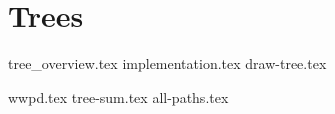 \documentclass{exam}
\begin{document}
\section{Trees}
{tree_overview.tex}
{implementation.tex}
{draw-tree.tex}
\begin{questions}
{wwpd.tex}
{tree-sum.tex}
{all-paths.tex}
\end{questions}
\end{document}
